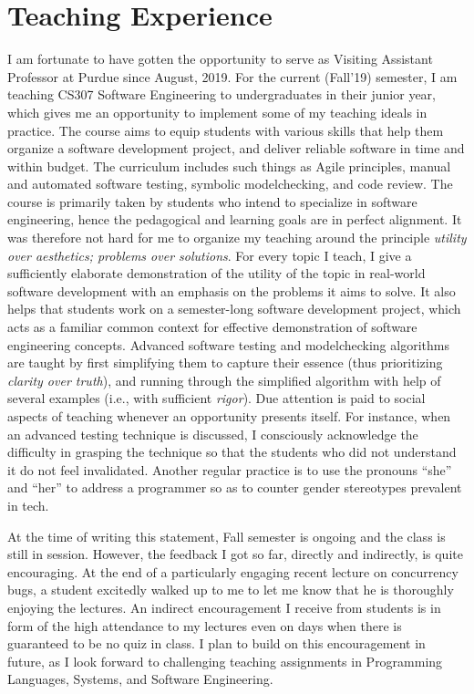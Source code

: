 \section*{Teaching Experience}

I am fortunate to have gotten the opportunity to serve as Visiting
Assistant Professor at Purdue since August, 2019. For the current
(Fall'19) semester, I am teaching CS307 Software Engineering to
undergraduates in their junior year, which gives me an opportunity to
implement some of my teaching ideals in practice. The course aims to
equip students with various skills that help them organize a software
development project, and deliver reliable software in time and within
budget. The curriculum includes such things as Agile principles,
manual and automated software testing, symbolic modelchecking, and
code review. The course is primarily taken by students who intend to
specialize in software engineering, hence the pedagogical and learning
goals are in perfect alignment. It was therefore not hard for me to
organize my teaching around the principle \emph{utility over
aesthetics; problems over solutions}. For every topic I teach, I give
a sufficiently elaborate demonstration of the utility of the topic in
real-world software development with an emphasis on the problems it
aims to solve. It also helps that students work on a semester-long
software development project, which acts as a familiar common context
for effective demonstration of software engineering concepts. Advanced
software testing and modelchecking algorithms are taught by first
simplifying them to capture their essence (thus prioritizing
\emph{clarity over truth}), and running through the simplified
algorithm with help of several examples (i.e., with sufficient
\emph{rigor}). Due attention is paid to social aspects of teaching
whenever an opportunity presents itself. For instance, when an
advanced testing technique is discussed, I consciously acknowledge the
difficulty in grasping the technique so that the students who did not
understand it do not feel invalidated. Another regular practice is to
use the pronouns ``she'' and ``her'' to address a programmer so as
to counter gender stereotypes prevalent in tech.

At the time of writing this statement, Fall semester is ongoing and
the class is still in session. However, the feedback I got so far,
directly and indirectly, is quite encouraging. At the end of a
particularly engaging recent lecture on concurrency bugs, a student
excitedly walked up to me to let me know that he is thoroughly
enjoying the lectures. An indirect encouragement I receive from
students is in form of the high attendance to my lectures even on days
when there is guaranteed to be no quiz in class. I plan to build on
this encouragement in future, as I look forward to challenging
teaching assignments in Programming Languages, Systems, and Software
Engineering.

